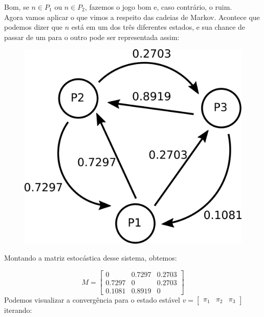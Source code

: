 \documentclass[12pt]{article}
\begin{document}
Bom, se $n \in P_1$ ou $n \in P_2$, fazemos o jogo bom e, caso contrário, o ruim.\\
Agora vamos aplicar o que vimos a respeito das cadeias de Markov. Acontece que podemos dizer que $n$ está em um dos três diferentes estados, e sua chance de passar de um para o outro pode ser representada assim:

\begin{figure}[H]
\centering
\includegraphics[scale=0.7]{fig3.png}
\end{figure}

Montando a matriz estocástica desse sistema, obtemos:

$$
M = 
\begin{bmatrix}
0 & 0.7297 & 0.2703\\
0.7297 & 0 & 0.2703\\
0.1081 & 0.8919 & 0
\end{bmatrix}
$$
Podemos visualizar a convergência para o estado estável $v = \begin{bmatrix} \pi_1 & \pi_2 & \pi_3 \end{bmatrix} $ iterando:
\end{document}
